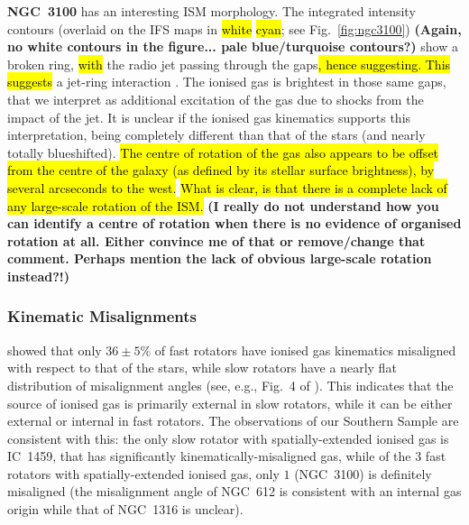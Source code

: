 \documentclass[a4paper,fleqn,usenatbib]{mnras}
\DeclareRobustCommand{\removed}[1]{{\sethlcolor{red}\hl{#1}}}
\DeclareRobustCommand{\added}[1]{{\sethlcolor{green}\hl{#1}}}
\begin{document}
\textbf{NGC~3100} has an interesting ISM morphology. The
 integrated intensity contours (overlaid on the IFS
maps in \removed{white} \added{cyan}; see Fig.~\ref{fig:ngc3100}) 
{\bf (Again, no white
  contours in the figure... pale blue/turquoise contours?)} show a
broken ring, \added{with} the radio jet passing through the gaps\removed{, hence suggesting}\added{. This suggests }
a jet-ring interaction \citep[see][]{ruffa2019a, ruffa2019b}. The
ionised gas is brightest in those same gaps, that we interpret as
additional excitation of the gas due to shocks from the impact of the
jet. It is unclear if the ionised gas kinematics supports this
interpretation, being completely different than that of the stars (and
nearly totally blueshifted). \removed{The centre of rotation of the gas also
appears to be offset from the centre of the galaxy (as defined by its
stellar surface brightness), by several arcseconds to the west.} \added{What is clear, is that there is a complete lack of any large-scale rotation of the ISM.} {\bf
  (I really do not understand how you can identify a centre of
  rotation when there is no evidence of organised rotation at
  all. Either convince me of that or remove/change that
  comment. Perhaps mention the lack of obvious large-scale rotation
  instead?!)}

\subsubsection{Kinematic Misalignments}
\label{subsec:kinmis}

\citet{Davis2011a} showed that only $36\pm5\%$ of fast rotators have
ionised gas kinematics misaligned with respect to that of the stars,
while slow rotators have a nearly flat distribution of misalignment
angles (see, e.g., Fig.~4 of \citealt{Davis2011a}). This indicates
that the source of ionised gas is primarily external in slow rotators,
while it can be either external or internal in fast rotators. The
observations of our Southern Sample are consistent with this: the only
slow rotator with spatially-extended ionised gas is IC~1459, that has
significantly kinematically-misaligned gas, while of the $3$ fast
rotators with spatially-extended ionised gas, only $1$ (NGC~3100) is
definitely misaligned (the misalignment angle of NGC~612 is consistent
with an internal gas origin while that of NGC~1316 is unclear).
             
\end{document}
